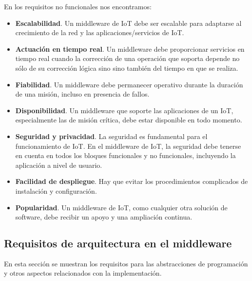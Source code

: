 { En los requisitos no funcionales nos encontramos:
 
  \begin{itemize}
     \item \textbf{Escalabilidad}. Un middleware de IoT debe ser escalable para adaptarse al crecimiento de la red y las aplicaciones/servicios de IoT.
     \item \textbf{Actuación en tiempo real}. Un middleware debe proporcionar servicios en tiempo real cuando la corrección de una operación que soporta depende no sólo de su corrección lógica sino sino también del tiempo en que se realiza.
     \item \textbf{Fiabilidad}. Un middleware debe permanecer operativo durante la duración de una misión, incluso en presencia de fallos.
     \item \textbf{Disponibilidad}. Un middleware que soporte las aplicaciones de un IoT, especialmente las de misión crítica, debe estar disponible en todo momento.
     \item \textbf{Seguridad y privacidad}. La seguridad es fundamental para el funcionamiento de IoT. En el middleware de IoT, la seguridad debe tenerse en cuenta en todos los bloques funcionales y no funcionales, incluyendo la aplicación a nivel de usuario.
     \item \textbf{Facilidad de despliegue}. Hay que evitar los procedimientos complicados de instalación y configuración.
     \item \textbf{Popularidad}. Un middleware de IoT, como cualquier otra solución de software, debe recibir un apoyo y una ampliación continua.
 \end{itemize}
 
\subsection{Requisitos de arquitectura en el middleware}

En esta sección se muestran los requisitos para las abstracciones de programación y otros aspectos relacionados con la implementación.

}
